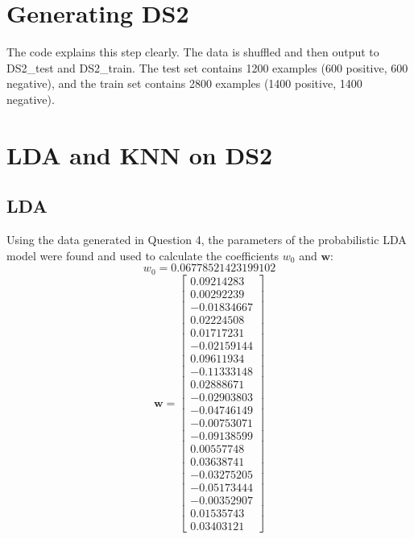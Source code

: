 \documentclass{article}
\begin{document}
\section{Generating DS2}
The code explains this step clearly. The data is shuffled and then output to DS2\_test and DS2\_train. The test set contains 1200 examples (600 positive, 600 negative), and the train set contains 2800 examples (1400 positive, 1400 negative).

\section{LDA and KNN on DS2}
\subsection{LDA}
Using the data generated in Question 4, the parameters of the probabilistic LDA model were found and used to calculate the coefficients \(w_0\) and \(\mathbf{w}\):\\

\[w_0 = 0.06778521423199102\]
\begin{equation}
  \mathbf{w}=
  \begin{bmatrix}
    0.09214283\\
        0.00292239\\
        -0.01834667\\
        0.02224508\\
        0.01717231\\
        -0.02159144\\
        0.09611934\\
        -0.11333148\\
        0.02888671\\
        -0.02903803\\
        -0.04746149\\
        -0.00753071\\
        -0.09138599\\
        0.00557748\\
        0.03638741\\
        -0.03275205\\
        -0.05173444\\
        -0.00352907\\
        0.01535743\\
        0.03403121
  \end{bmatrix}
\end{equation}
\end{document}

